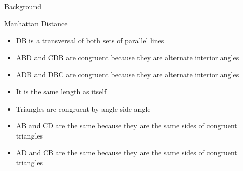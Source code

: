 \documentclass{beamer}
\theoremstyle{case}
\begin{document}
\begin{section}{Background}
\begin{subsection}{Manhattan Distance}
\begin{frame}
{\begin{itemize}
            \item DB is a transversal of both sets of parallel lines
            \item ABD and CDB are congruent because they are alternate interior angles
            \item ADB and DBC are congruent because they are alternate interior angles
            \item It is the same length as itself
            \item Triangles are congruent by angle side angle
            \item AB and CD are the same because they are the same sides of congruent triangles
            \item AD and CB are the same because they are the same sides of congruent triangles
        \end{itemize}
    }
\end{frame}


\end{subsection}
\end{section}
\end{document}
